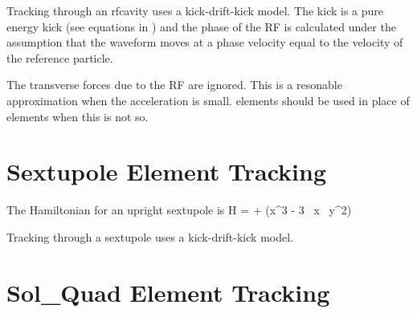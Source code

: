 Tracking through an rfcavity uses a kick-drift-kick model. The kick is
a pure energy kick (see equations in ) and the phase of
the RF is calculated under the assumption that the waveform moves at a
phase velocity equal to the velocity of the reference particle.

The transverse forces due to the RF are ignored. This is a resonable
approximation when the acceleration is small.  elements
should be used in place of  elements when this is not so.

\section{Sextupole Element Tracking}
\label{s:sextupole.std}

The Hamiltonian for an upright sextupole is
\Begineq
  H =  +  (x^3 - 3 \, x \, y^2)
\Endeq

Tracking through a sextupole uses a kick-drift-kick model.

\section{Sol\_Quad Element Tracking}
\label{s:sol.quad.std}

